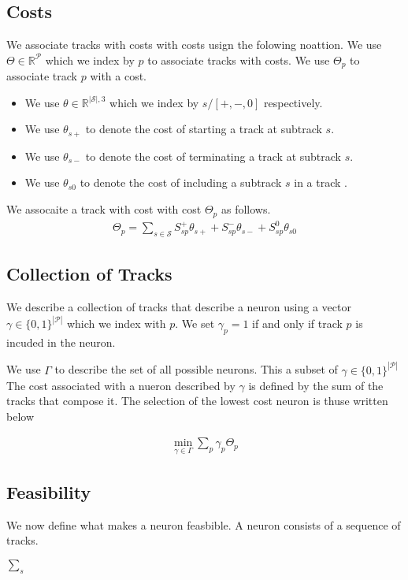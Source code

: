 \documentclass{article}
\begin{document}
\subsection{Costs }
We associate tracks with costs with costs usign the folowing noattion.  We use $\Theta \in \mathbb{R}^{\mathcal{P}}$ which we index by $p$ to associate  tracks  with costs.  We use $\Theta_p$ to associate track $p$ with a cost.  
\begin{itemize}
\item We use $\theta \in \mathbb{R}^{|\mathcal{S}|,3}$ which we index by $s/ [+,-,0]$ respectively.  
\item 
We use $\theta_{s+}$ to denote the cost of starting a track at subtrack $s$.  
\item 
We use $\theta_{s-}$ to denote the cost of terminating a track at subtrack $s$. 
\item 
We use $\theta_{s0}$ to denote the cost of including  a subtrack $s$ in a track  . 
 \end{itemize}
 
 We assocaite a track with cost with cost $\Theta_p$ as follows.  
 \begin{align}
 \Theta_p=\sum_{s \in \mathcal{S}}S^+_{sp}\theta_{s+}+S^-_{sp}\theta_{s-}+S^0_{sp}\theta_{s0}
 \end{align}
 
 \subsection{Collection of Tracks}
 
 We describe a collection of tracks that describe a neuron using a vector $\gamma \in \{ 0,1\}^{|\mathcal{P}|}$ which we index with $p$.  We set $\gamma_p=1$ if and only if track $p$ is incuded in the neuron.  
 
 We use $\Gamma$ to describe the set of all possible neurons.  This a subset of $\gamma \in \{ 0,1\}^{|\mathcal{P}|}$ The cost associated with a nueron described by $\gamma$ is defined by the sum of the tracks that compose it.  The selection of the lowest cost neuron is thuse written below   
 
 \begin{align}
 \min_{\gamma \in \Gamma}\sum_p \gamma_p\Theta_p
 \end{align}
 
 \subsection{Feasibility}

We now define what makes a neuron feasbible.   A neuron consists of a sequence of tracks.  
 
 $\sum_s$



\end{document}
